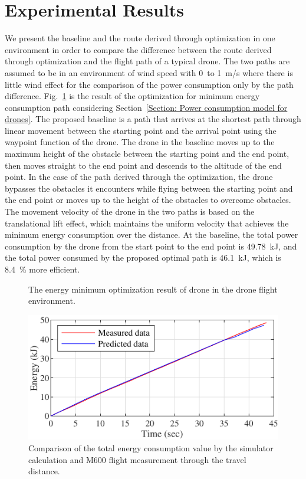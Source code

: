 \documentclass[journal]{./template/IEEEtran}
\begin{document}
\section{Experimental Results}
We present the baseline and the route derived through optimization in one environment in order to compare the difference between the route derived through optimization and the flight path of a typical drone.
The two paths are assumed to be in an environment of wind speed with 0~to 1~m/s where there is little wind effect for the comparison of the power consumption only by the path difference.
Fig.~\ref{fig: opt_environ} is the result of the optimization for minimum energy consumption path considering Section~\ref{Section: Power consumption model for drones}.
The proposed baseline is a path that arrives at the shortest path through linear movement between the starting point and the arrival point using the waypoint function of the drone. The drone in the baseline moves up to the maximum height of the obstacle between the starting point and the end point, then moves straight to the end point and descends to the altitude of the end point. 
In the case of the path derived through the optimization, the drone bypasses the obstacles it encounters while flying between the starting point and the end point or moves up to the height of the obstacles to overcome obstacles. 
The movement velocity of the drone in the two paths is based on the translational lift effect, which maintains the uniform velocity that achieves the minimum energy consumption over the distance. 
At the baseline, the total power consumption by the drone from the start point to the end point is 49.78~kJ, and the total power consumed by the proposed optimal path is 46.1~kJ, which is 8.4~\% more efficient. 


\begin{figure}[ht]
\centering
{}
\qquad
{}
\caption{The energy minimum optimization result of drone in the drone flight environment.}
\label{fig: opt_environ}
\end{figure}

\begin{figure}[ht]
\centering\includegraphics[scale=1.0]{fig14/S_E.pdf}
\caption{Comparison of the total energy consumption value by the simulator calculation and M600 flight measurement through the travel distance.}
\label{fig:consumed_energy}
\end{figure}
\end{document}

